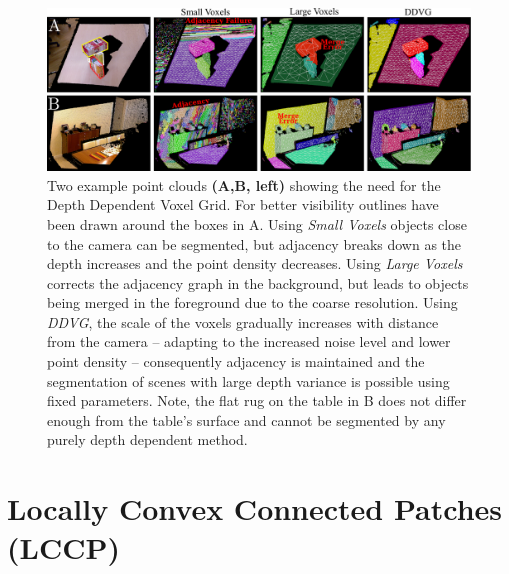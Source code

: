 \begin{figure}[!ht]
  \centering
  \includegraphics[width = \linewidth]{figures/CVPR2014/transform_results_v2}
\caption[Depth Adaptive Transform]{Two example point clouds \textbf{(A,B, left)} showing the need for the Depth Dependent Voxel Grid. For better visibility outlines have been drawn around the boxes in A. Using \textit{Small Voxels} objects close to the camera can be segmented, but adjacency breaks down as the depth increases and the point density decreases. Using \textit{Large Voxels} corrects the adjacency graph in the background, but leads to objects being merged in the foreground due to the coarse resolution. Using \textit{DDVG}, the scale of the voxels gradually increases with distance from the camera -- adapting to the increased noise level and lower point density -- consequently adjacency is maintained and the segmentation of scenes with large depth variance is possible using fixed parameters. Note, the flat rug on the table in B does not differ enough from the table's surface and cannot be segmented by any purely depth dependent method.}
\label{fig:quantization_transform}
\end{figure}

\section{Locally Convex Connected Patches (LCCP)}

